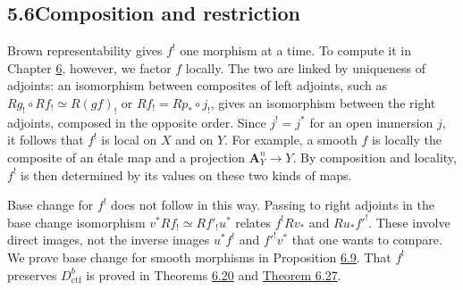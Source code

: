 \documentclass[11pt]{article}
\begin{document}
\subsection*{\texorpdfstring{5.6\quad Composition and restriction}{5.6 Composition and restriction}}
\label{bp508}%
\label{bp509}%
Brown representability gives \(f^!\) one morphism at a time. To compute it in Chapter \hyperref[bp513]{6}, however, we factor \(f\) locally. The two are linked by uniqueness of adjoints: an isomorphism between composites of left adjoints, such as \(Rg_!\circ Rf_!\simeq R(gf)_!\) or \(Rf_!=Rp_*\circ j_!\), gives an isomorphism between the right adjoints, composed in the opposite order. Since \(j^!=j^*\) for an open immersion \(j\), it follows that \(f^!\) is local on \(X\) and on \(Y\). For example, a smooth \(f\) is locally the composite of an étale map and a projection \(\mathbf A^n_Y\to Y\). By composition and locality, \(f^!\) is then determined by its values on these two kinds of maps.

Base change for \(f^!\) does not follow in this way. Passing to right adjoints in the base change isomorphism \(v^*Rf_!\simeq Rf'_!u^*\) relates \(f^!Rv_*\) and \(Ru_*f'^!\). These involve direct images, not the inverse images \(u^*f^!\) and \(f'^!v^*\) that one wants to compare. We prove base change for smooth morphisms in Proposition \hyperref[bp542]{6.9}. That \(f^!\) preserves \(D^b_{\mathrm{ctf}}\) is proved in Theorems \hyperref[bp573]{6.20} and \hyperref[bp596]{Theorem 6.27}.
\end{document}
